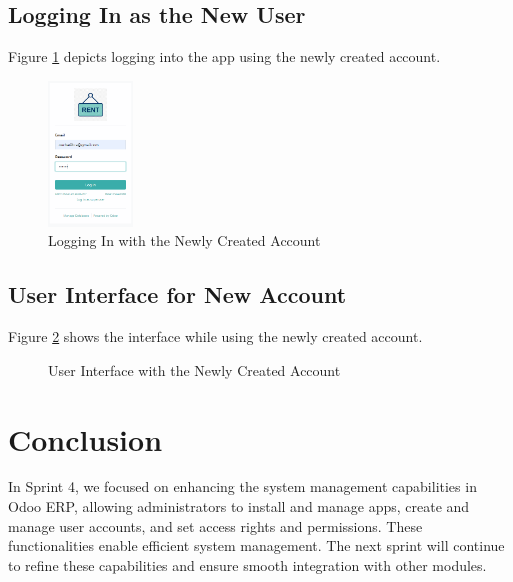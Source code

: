 \subsection{Logging In as the New User}
Figure \ref{fig:login_new_user} depicts logging into the app using the newly created account.

\begin{figure}[h]
    \centering
    \includegraphics[width=0.2\textwidth]{sprint4/managesystem5.png} %
    \caption{Logging In with the Newly Created Account}
    \label{fig:login_new_user}
\end{figure}

\subsection{User Interface for New Account}
Figure \ref{fig:new_account_interface} shows the interface while using the newly created account.

\begin{figure}[h]
    \centering
    \caption{User Interface with the Newly Created Account}
    \label{fig:new_account_interface}
\end{figure}
\newpage
\section*{Conclusion}

In Sprint 4, we focused on enhancing the system management capabilities in Odoo ERP, allowing administrators to install and manage apps, create and manage user accounts, and set access rights and permissions. These functionalities enable efficient system management. The next sprint will continue to refine these capabilities and ensure smooth integration with other modules.
